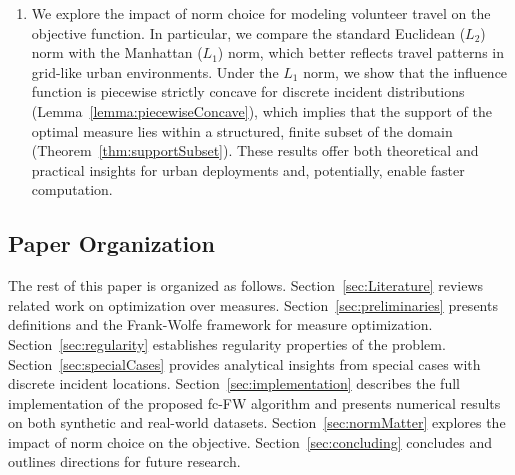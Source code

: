 \documentclass[stsy,sglanonrev]{informs4}
\begin{document}
\begin{enumerate}[label=(\alph*)]
    \item We explore the impact of norm choice for modeling volunteer travel on the objective function. In particular, we compare the standard Euclidean ($L_2$) norm with the Manhattan ($L_1$) norm, which better reflects travel patterns in grid-like urban environments. Under the $L_1$ norm, we show that the influence function is piecewise strictly concave for discrete incident distributions (Lemma~\ref{lemma:piecewiseConcave}), which implies that the support of the optimal measure lies within a structured, finite subset of the domain (Theorem~\ref{thm:supportSubset}). These results offer both theoretical and practical insights for urban deployments and, potentially, enable faster computation.
\end{enumerate}





\subsection{Paper Organization} The rest of this paper is organized as follows. Section~\ref{sec:Literature} reviews related work on optimization over measures. Section~\ref{sec:preliminaries} presents definitions and the Frank-Wolfe framework for measure optimization. Section~\ref{sec:regularity} establishes regularity properties of the problem. Section~\ref{sec:specialCases} provides analytical insights from special cases with discrete incident locations. Section~\ref{sec:implementation} describes the full implementation of the proposed fc-FW algorithm and presents numerical results on both synthetic and real-world datasets. Section~\ref{sec:normMatter} explores the impact of norm choice on the objective. Section~\ref{sec:concluding} concludes and outlines directions for future research.
\end{document}
